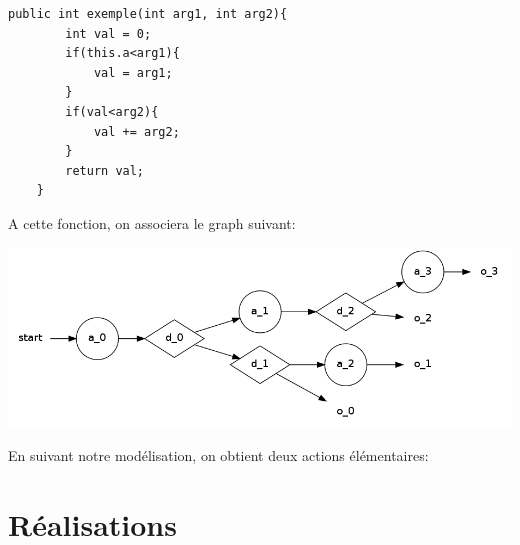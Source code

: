 \documentclass[a4paper]{report}
\begin{document}
\begin{lstlisting}
public int exemple(int arg1, int arg2){
		int val = 0;
		if(this.a<arg1){
			val = arg1;
		}
		if(val<arg2){
			val += arg2;
		}
		return val;
	}
\end{lstlisting}
A cette fonction, on associera le graph suivant:\\


\begin{center}
   \includegraphics[scale=0.3]{../graphviz/doubleStackGraph.png}
\end{center}



En suivant notre modélisation, on obtient deux actions élémentaires:


\chapter*{Réalisations}
\end{document}
